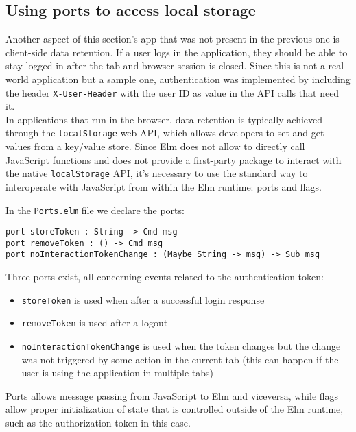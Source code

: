 
\subsection{Using ports to access local storage}

Another aspect of this section's app that was not present in the previous one is client-side data retention. If a user logs in the application, they should be able to stay logged in after the tab and browser session is closed. Since this is not a real world application but a sample one, authentication was implemented by including the header \texttt{X-User-Header} with the user ID as value in the API calls that need it.\\
In applications that run in the browser, data retention is typically achieved through the \texttt{localStorage} web API\cite{noauthor_window_nodate}, which allows developers to set and get values from a key/value store. Since Elm does not allow to directly call JavaScript functions and does not provide a first-party package to interact with the native \texttt{localStorage} API, it's necessary to use the standard way to interoperate with JavaScript from within the Elm runtime: ports and flags.

In the \texttt{Ports.elm} file we declare the ports:
\begin{verbatim}
port storeToken : String -> Cmd msg
port removeToken : () -> Cmd msg
port noInteractionTokenChange : (Maybe String -> msg) -> Sub msg
\end{verbatim}

Three ports exist, all concerning events related to the authentication token:
\begin{itemize}
    \item \texttt{storeToken} is used when after a successful login response
    \item \texttt{removeToken} is used after a logout
    \item \texttt{noInteractionTokenChange} is used when the token changes but the change was not triggered by some action in the current tab (this can happen if the user is using the application in multiple tabs) 
\end{itemize}
Ports allows message passing from JavaScript to Elm and viceversa, while flags allow proper initialization of state that is controlled outside of the Elm runtime, such as the authorization token in this case.\\


